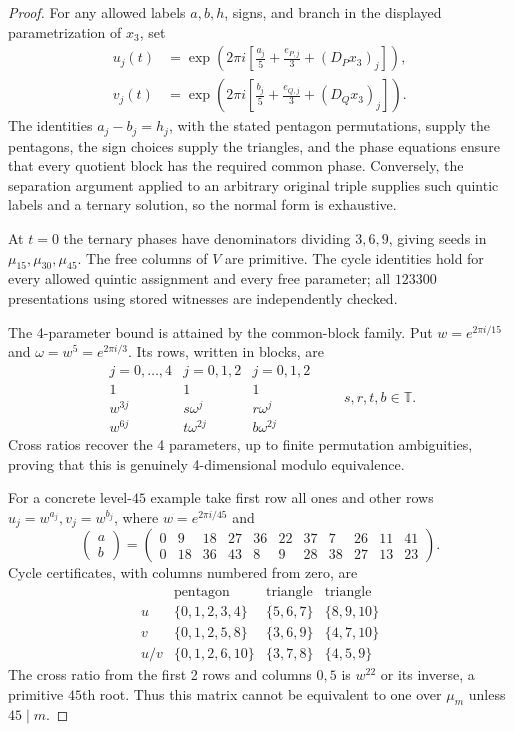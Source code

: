 \documentclass[11pt,a4paper]{article}
\theoremstyle{plain}
\theoremstyle{definition}
\theoremstyle{plain}
\begin{document}
\begin{proof}
\medskip
For any allowed labels $a,b,h$, signs, and branch in the displayed parametrization of $x_3$, set
\begin{align*}
u_j(t)&=\exp\!\left(2\pi i\left[\frac{a_j}{5} +\frac{e_{P,j}}3+(D_Px_3)_j\right]\right),\\
v_j(t)&=\exp\!\left(2\pi i\left[\frac{b_j}{5} +\frac{e_{Q,j}}3+(D_Qx_3)_j\right]\right).
\end{align*}
The identities $a_j-b_j=h_j$, with the stated pentagon permutations, supply the pentagons, the sign choices supply the triangles, and the phase equations ensure that every quotient block has the required common phase. Conversely, the separation argument applied to an arbitrary original triple supplies such quintic labels and a ternary solution, so the normal form is exhaustive.

At $t=0$ the ternary phases have denominators dividing $3,6,9$, giving seeds in $\mu_{15},\mu_{30},\mu_{45}$. The free columns of $V$ are primitive. The cycle identities hold for every allowed quintic assignment and every free parameter; all $123300$ presentations using stored witnesses are independently checked.

The 4-parameter bound is attained by the common-block family. Put $w=e^{2\pi i/15}$ and $\omega=w^5=e^{2\pi i/3}$. Its rows, written in blocks, are
$$\begin{array}{c|c|c}
j=0,\ldots,4&j=0,1,2&j=0,1,2\\\hline
1&1&1\\
w^{3j}&s\omega^j&r\omega^j\\
w^{6j}&t\omega^{2j}&b\omega^{2j}
\end{array}
\qquad s,r,t,b\in\mathbb{T}.$$
Cross ratios recover the 4 parameters, up to finite permutation ambiguities, proving that this is genuinely 4-dimensional modulo equivalence.

For a concrete level-$45$ example take first row all ones and other rows $u_j=w^{a_j},v_j=w^{b_j}$, where $w=e^{2\pi i/45}$ and
$$\begin{pmatrix}a\\b\end{pmatrix}=
\begin{pmatrix}
0&9&18&27&36&22&37&7&26&11&41\\
0&18&36&43&8&9&28&38&27&13&23
\end{pmatrix}.$$
Cycle certificates, with columns numbered from zero, are
$$\begin{array}{c|c|c|c}
&\text{pentagon}&\text{triangle}&\text{triangle}\\\hline
u&\{0,1,2,3,4\}&\{5,6,7\}&\{8,9,10\}\\
v&\{0,1,2,5,8\}&\{3,6,9\}&\{4,7,10\}\\
u/v&\{0,1,2,6,10\}&\{3,7,8\}&\{4,5,9\}
\end{array}$$
The cross ratio from the first 2 rows and columns $0,5$ is $w^{22}$ or its inverse, a primitive $45$th root. Thus this matrix cannot be equivalent to one over $\mu_m$ unless $45\mid m$.


\end{proof}
\end{document}
